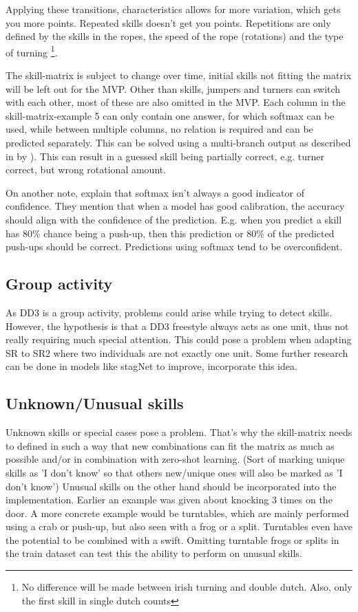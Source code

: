 Applying these transitions, characteristics allows for more variation, which gets you more points. Repeated skills doesn't get you points. Repetitions are only defined by the skills in the ropes, the speed of the rope (rotations) and the type of turning \footnote{No difference will be made between irish turning and double dutch. Also, only the first skill in single dutch counts}.

\medskip

The skill-matrix is subject to change over time, initial skills not fitting the matrix will be left out for the MVP. Other than skills, jumpers and turners can switch with each other, most of these are also omitted in the MVP.
Each column in the skill-matrix-example 5 can only contain one answer, for which softmax can be used, while between multiple columns, no relation is required and can be predicted separately. This can be solved using a multi-branch output as described in by \autocite{Coulibaly_2022}). This can result in a guessed skill being partially correct, e.g. turner correct, but wrong rotational amount.

On another note, \textcite{Guo_2017} explain that softmax isn't always a good indicator of confidence. They mention that when a model has good calibration, the accuracy should align with the confidence of the prediction. E.g. when you predict a skill has 80\% chance being a push-up, then this prediction or 80\% of the predicted push-ups should be correct. Predictions using softmax tend to be overconfident.

\subsection{Group activity}

As DD3 is a group activity, problems could arise while trying to detect skills. However, the hypothesis is that a DD3 freestyle always acts as one unit, thus not really requiring much special attention. This could pose a problem when adapting SR to SR2 where two individuals are not exactly one unit. Some further research can be done in models like stagNet \autocite{Qi_2020} to improve, incorporate this idea.

\subsection{Unknown/Unusual skills}
\label{proposal-subsec:literature-unknown-unusual-skills}

Unknown skills or special cases pose a problem. That’s why the skill-matrix needs to defined
in such a way that new combinations can fit the matrix as much as possible and/or in combination with zero-shot learning. (Sort of marking unique skills as ’I don’t know’ so that others new/unique ones will also be marked as ’I don’t know’) Unusual skills on the other hand should be incorporated into the implementation.
Earlier an example was given about knocking 3 times on the door. A more concrete example would be turntables, which are mainly performed using a crab or push-up, but also seen with a frog or a split.
Turntables even have the potential to be combined with a swift. Omitting turntable frogs or splits in the train dataset can test this the ability to perform on unusual skills.


